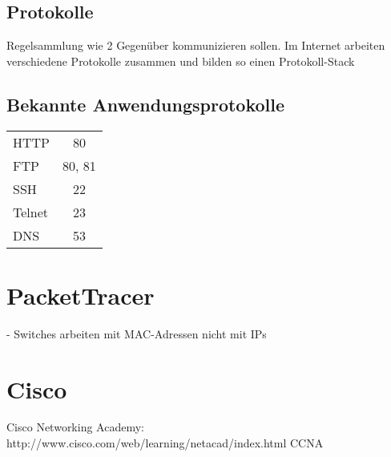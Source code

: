 \documentclass[11pt,a4paper]{article}
\begin{document}
\subsection{Protokolle}
Regelsammlung wie 2 Gegenüber kommunizieren sollen. Im Internet arbeiten verschiedene Protokolle zusammen und bilden so einen Protokoll-Stack

\subsection{Bekannte Anwendungsprotokolle}
\begin{tabular}{l c}
HTTP & 80 \\
FTP & 80, 81 \\
SSH & 22 \\
Telnet & 23 \\
DNS & 53 \\
\end{tabular}



\section{PacketTracer}
- Switches arbeiten mit MAC-Adressen nicht mit IPs
\section{Cisco}
Cisco Networking Academy: 
http://www.cisco.com/web/learning/netacad/index.html
CCNA
\end{document}
